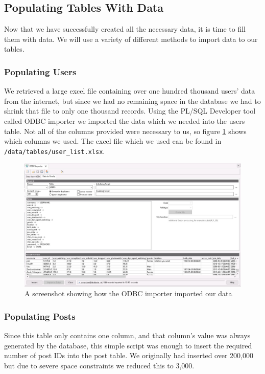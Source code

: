 \subsection{Populating Tables With Data}

Now that we have successfully created all the necessary data, it is time to fill them with data. We will use a variety of different methods to import data to our tables.

\subsubsection{Populating Users}

We retrieved a large excel file containing over one hundred thousand users' data from the internet, but since we had no remaining space in the database we had to shrink that file to only one thousand records. Using the PL/SQL Developer tool called ODBC importer we imported the data which we needed into the users table. Not all of the columns provided were necessary to us, so figure \ref{users-odbc} shows which columns we used. The excel file which we used can be found in \verb`/data/tables/user_list.xlsx`.

\begin{figure}[hbtp]
	\centering
	\includegraphics[width=\linewidth]{images/users_odbc.jpeg}
	\caption{A screenshot showing how the ODBC importer imported our data}
	\label{users-odbc}
\end{figure}

\subsubsection{Populating Posts}

Since this table only contains one column, and that column's value was always generated by the database, this simple script was enough to insert the required number of post IDs into the post table. We originally had inserted over 200,000 but due to severe space constraints we reduced this to 3,000.

